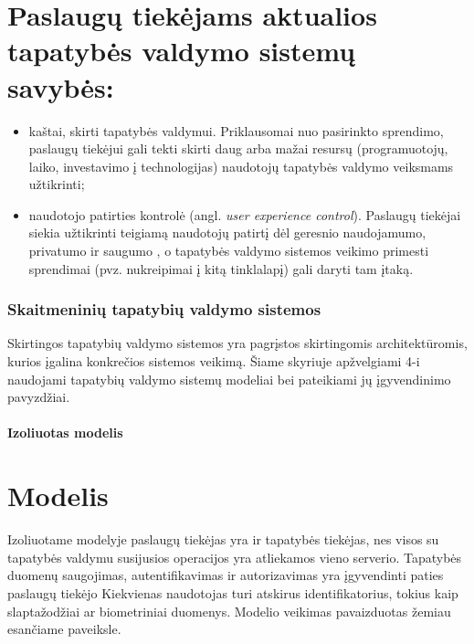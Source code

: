 \chapter{\textbf{Paslaugų tiekėjams aktualios tapatybės valdymo sistemų savybės:}}

\begin{itemize}
    \item kaštai, skirti tapatybės valdymui. Priklausomai nuo pasirinkto sprendimo,
    paslaugų tiekėjui gali tekti skirti daug arba mažai resursų (programuotojų, laiko, investavimo į technologijas)
    naudotojų tapatybės valdymo veiksmams užtikrinti;
    \item naudotojo patirties kontrolė (angl. \textit{user experience control}). Paslaugų tiekėjai siekia užtikrinti teigiamą
    naudotojų patirtį dėl geresnio naudojamumo, privatumo ir saugumo \cite{Dhamija2008}, o tapatybės valdymo sistemos veikimo primesti sprendimai (pvz. nukreipimai į kitą tinklalapį) gali daryti
    tam įtaką.
\end{itemize}

\subsection{Skaitmeninių tapatybių valdymo sistemos}

Skirtingos tapatybių valdymo sistemos yra pagrįstos skirtingomis architektūromis, kurios įgalina
konkrečios sistemos veikimą. Šiame skyriuje apžvelgiami 4-i naudojami tapatybių valdymo sistemų
modeliai bei pateikiami jų įgyvendinimo pavyzdžiai.

\subsubsection{Izoliuotas modelis}

\chapter{\textbf{Modelis}}

Izoliuotame modelyje paslaugų tiekėjas yra ir tapatybės tiekėjas, nes visos su tapatybės valdymu
susijusios operacijos yra atliekamos vieno serverio. Tapatybės duomenų saugojimas, autentifikavimas
ir autorizavimas yra įgyvendinti paties paslaugų tiekėjo \cite{Cao2010} Kiekvienas naudotojas turi atskirus identifikatorius,
tokius kaip slaptažodžiai ar biometriniai duomenys. Modelio veikimas pavaizduotas žemiau esančiame paveiksle.


